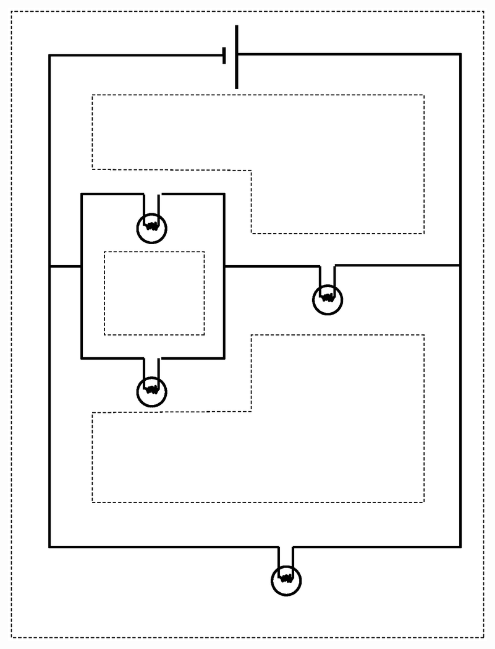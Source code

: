\newpage

\begin{center}
\includegraphics[width=0.95\textwidth]{electric_circuits/cutout_page2.eps}
\cleardoublepage

\end{center}


